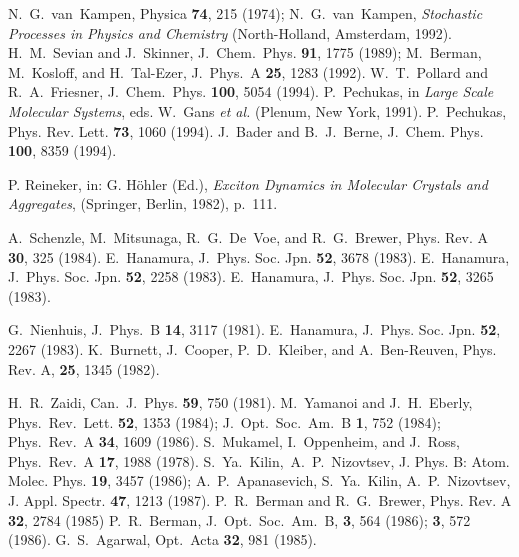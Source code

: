\documentclass[12pt,twoside,a4paper]{report}
\begin{document}
{\begin{thebibliography}{999}
 N.~G.~van~Kampen, Physica {\bf 74}, 215 (1974);
                 N.~G.~van~Kampen,
                 {\it Stochastic Processes in Physics and Chemistry}
                 (North-Holland, Amsterdam, 1992).
 H.~M.~Sevian and J.~Skinner,
                  J.~Chem.~Phys. {\bf 91}, 1775 (1989);
                 M.~Berman, M.~Kosloff, and H.~Tal-Ezer, 
                 J.~Phys.~A {\bf 25}, 1283 (1992).
 W.~T.~Pollard and R.~A.~Friesner, 
                 J.~Chem.~Phys. {\bf 100}, 5054 (1994).  
 P.~Pechukas, in {\it Large Scale Molecular Systems}, 
                 eds. W.~Gans {\it et al.} (Plenum, New York, 1991).
 P.~Pechukas, Phys. Rev. Lett. {\bf 73}, 1060 (1994).
 J.~Bader and B.~J.~Berne, 
                 J.~Chem. Phys. {\bf 100}, 8359 (1994).

 P. Reineker, in: G. H\"ohler (Ed.), 
                 {\it Exciton Dynamics
                 in Molecular Crystals and Aggregates}, 
                 (Springer, Berlin, 1982), p.~111.




 A.~Schenzle, M.~Mitsunaga, R.~G.~De~Voe, and R.~G.~Brewer,
                 Phys. Rev. A {\bf 30}, 325 (1984).
 E.~Hanamura, J.~Phys. Soc. Jpn. {\bf 52}, 3678 (1983).
 E.~Hanamura, J.~Phys. Soc. Jpn. {\bf 52}, 2258 (1983).
 E.~Hanamura, J.~Phys. Soc. Jpn. {\bf 52}, 3265 (1983).

 G.~Nienhuis, J.~Phys.~B {\bf 14}, 3117 (1981).
 E.~Hanamura, J.~Phys. Soc. Jpn. {\bf 52}, 2267 (1983).
 K.~Burnett, J.~Cooper, P.~D.~Kleiber, and A.~Ben-Reuven,
                 Phys. Rev. A, {\bf 25}, 1345 (1982).

 H.~R.~Zaidi, Can.~J.~Phys. {\bf 59}, 750 (1981).
 M.~Yamanoi and J.~H.~Eberly, 
                 Phys.~Rev.~Lett. {\bf 52}, 1353 (1984);
                 J.~Opt.~Soc.~Am.~B {\bf 1}, 752 (1984);
                 Phys.~Rev.~A {\bf 34}, 1609 (1986).
 S.~Mukamel, I.~Oppenheim, and J.~Ross, 
                 Phys.~Rev.~A {\bf 17}, 1988 (1978).
                  S.~Ya.~Kilin,~A.~P.~Nizovtsev, J.
                  Phys. B: Atom. Molec. Phys.  {\bf 19}, 3457 (1986); 
                  A.~P.~Apanasevich, S.~Ya.~Kilin, A.~P.~Nizovtsev, 
                  J. Appl. Spectr.  {\bf 47}, 1213 (1987).  
 P.~R.~Berman and R.~G.~Brewer,
                 Phys. Rev. A {\bf 32}, 2784 (1985)
                 P.~R.~Berman, J.~Opt.~Soc.~Am.~B, {\bf 3}, 564 (1986);
                 {\bf 3}, 572 (1986).
 G.~S.~Agarwal, Opt.~Acta {\bf 32}, 981 (1985).



\end{thebibliography}}
\end{document}
